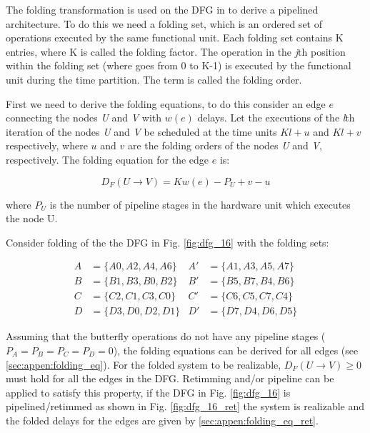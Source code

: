 \documentclass[a4paper, 10pt, conference]{ieeeconf}
\begin{document}
The folding transformation is used on the DFG in to derive a pipelined architecture. To do this we need a folding set, which is an ordered set of operations executed by the same functional unit. Each folding set contains K entries, where K is called the folding factor. The operation in the \textit{j}th position within the folding set (where goes from 0 to K-1) is executed by the functional unit during the time partition. The term is called the folding order.

First we need to derive the folding equations, to do this consider an edge $e$ connecting the nodes \textit{U} and \textit{V} with $w(e)$ delays. Let the executions of the \textit{l}th iteration of the nodes \textit{U} and \textit{V} be scheduled at the time units $Kl+u$ and $Kl+v$ respectively, where $u$ and $v$ are the folding orders of the nodes \textit{U} and \textit{V}, respectively. The folding equation for the edge $e$ is:

\begin{equation}
    D_F(U \to V) = Kw(e)-P_U+v-u
\end{equation}

where $P_U$ is the number of pipeline stages in the hardware unit which executes the node U.

Consider folding of the the DFG in Fig. \ref{fig:dfg_16} with the folding sets:

\begin{align*}
    A&= \{ A0,A2,A4,A6 \}  & A'&= \{ A1,A3,A5,A7 \} \\
    B&=\{ B1,B3,B0,B2 \}  &B'&=\{ B5,B7,B4,B6 \} \\
    C&=\{ C2,C1,C3,C0 \}  &C'&=\{ C6,C5,C7,C4 \} \\ 
    D&=\{ D3,D0,D2,D1 \}  &D'&=\{ D7,D4,D6,D5 \} 
    \label{eq:foldingset_16}
\end{align*}

Assuming that the butterfly operations do not have any pipeline stages ($P_A=P_B=P_C=P_D=0$), the folding equations can be derived for all edges (see \ref{sec:appen:folding_eq}). For the folded system to be realizable, $D_F(U\to V)\geq0$ must hold for all the edges in the DFG. Retimming and/or pipeline can be applied to satisfy this property, if the DFG in Fig. \ref{fig:dfg_16} is pipelined/retimmed as shown in Fig. \ref{fig:dfg_16_ret} the system is realizable and the folded delays for the edges are given by \ref{sec:appen:folding_eq_ret}.
\end{document}
